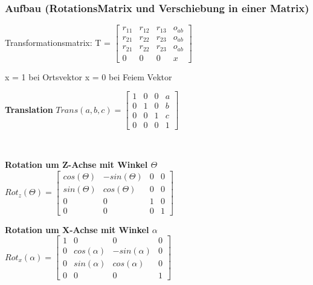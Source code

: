 	\subsubsection{Aufbau \small{ (RotationsMatrix und Verschiebung in einer
	Matrix)}}
		\begin{minipage}{10cm}
			Transformationsmatrix: T = $ 
    			\begin{bmatrix} 
			    	r_{11} & r_{12} & r_{13} & o_{ab} \\
			        r_{21} & r_{22} & r_{23} & o_{ab} \\
			        r_{21} & r_{22} & r_{23} & o_{ab} \\
			        0 & 0 & 0 & x                              
			    \end{bmatrix}$
                
       			x = 1 bei Ortsvektor \newline
                x = 0 bei Feiem Vektor
		\end{minipage}
        \begin{minipage}{0.33\linewidth}
            \textbf{Translation}\newline
            $Trans(a,b,c)=\begin{bmatrix}
            1 & 0 & 0 & a \\ 
            0 & 1 & 0 & b \\ 
            0 & 0 & 1 & c \\ 
            0 & 0 & 0 &  1
            \end{bmatrix}$
        \end{minipage}
\\
        \begin{minipage}{0.33\linewidth}
             \textbf{Rotation um Z-Achse mit Winkel $\varTheta$}\newline
            $ Rot_z(\varTheta)=\begin{bmatrix}
            cos(\varTheta)& -sin(\varTheta) & 0 & 0 \\ 
            sin(\varTheta)&  cos(\varTheta)& 0 & 0 \\ 
            0 & 0 & 1 & 0 \\ 
            0 & 0 & 0 & 1
            \end{bmatrix} $
        \end{minipage} 
        \begin{minipage}{0.33\linewidth}
            \textbf{Rotation um X-Achse mit Winkel $ \alpha$}\newline
            $ Rot_x(\alpha)=\begin{bmatrix}
            1 & 0 & 0 & 0 \\ 
            0 & cos(\alpha) & -sin(\alpha) & 0 \\ 
            0 & sin(\alpha) & cos(\alpha) & 0 \\ 
            0 & 0 & 0 & 1
            \end{bmatrix}$
        \end{minipage}    
